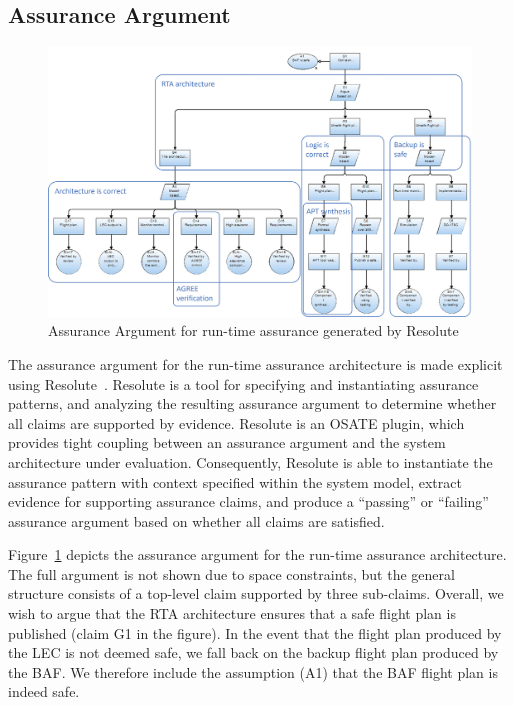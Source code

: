 \subsection{Assurance Argument}

\begin{figure}
	\centering
	\includegraphics[width=\textwidth]{figures/rta-resolute.jpg}
	\caption{Assurance Argument for run-time assurance generated by Resolute}
	\label{fig:rta-resolute}
\end{figure}

The assurance argument for the run-time assurance architecture is made explicit using Resolute~\cite{resolute}.  Resolute is a tool for specifying and instantiating assurance patterns, and analyzing the resulting assurance argument to determine whether all claims are supported by evidence.  Resolute is an OSATE plugin, which provides tight coupling between an assurance argument and the system architecture under evaluation.  Consequently, Resolute is able to instantiate the assurance pattern with context specified within the system model, extract evidence for supporting assurance claims, and produce a ``passing'' or ``failing'' assurance argument based on whether all claims are satisfied.

Figure~\ref{fig:rta-resolute} depicts the assurance argument for the run-time assurance architecture.  The full argument is not shown due to space constraints, but the general structure consists of a top-level claim supported by three sub-claims.  Overall, we wish to argue that the RTA architecture ensures that a safe flight plan is published (claim G1 in the figure).  In the event that the flight plan produced by the LEC is not deemed safe, we fall back on the backup flight plan produced by the BAF.  We therefore include the assumption (A1) that the BAF flight plan is indeed safe.

